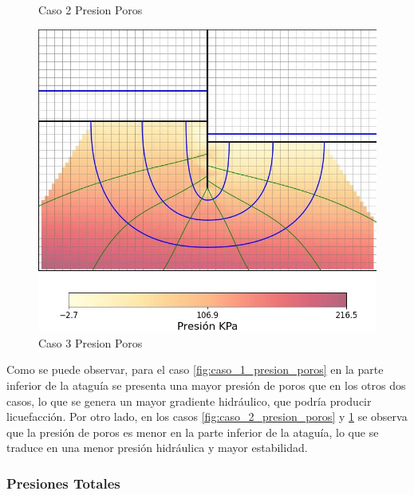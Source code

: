 \begin{figure}[H]
\begin{minipage}{0.32\textwidth}
        \caption{Caso 2 Presion Poros}
        \label{fig:caso_2_presion_poros}
    \end{minipage}
    \begin{minipage}{0.32\textwidth}
        \centering
        \includegraphics[width=\textwidth]{GRAFICOS/caso_3_presion_poros.jpg}
        \caption{Caso 3 Presion Poros}
        \label{fig:caso_3_presion_poros}
    \end{minipage}
\end{figure}

Como se puede observar, para el caso \ref{fig:caso_1_presion_poros} en la parte inferior de la ataguía se presenta una mayor presión de poros que en los otros dos casos, lo que se genera un mayor gradiente hidráulico, que podría producir licuefacción. Por otro lado, en los casos \ref{fig:caso_2_presion_poros} y \ref{fig:caso_3_presion_poros} se observa que la presión de poros es menor en la parte inferior de la ataguía, lo que se traduce en una menor presión hidráulica y mayor estabilidad.

\subsubsection{Presiones Totales}


